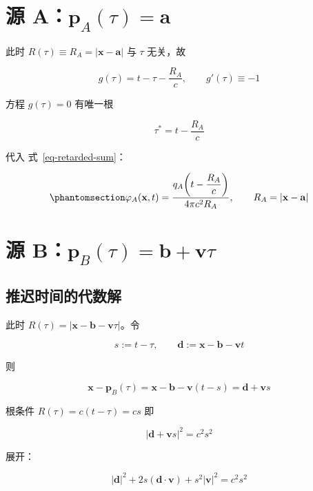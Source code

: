 \documentclass[
  chinese,
  a4paper,
  UTF8,
  12pt,
  oneside,
  openany]{ctexbook}
\theoremstyle{plain}
\theoremstyle{plain}
\theoremstyle{plain}
\theoremstyle{definition}
\theoremstyle{plain}
\theoremstyle{plain}
\theoremstyle{remark}
\begin{document}
\section{\texorpdfstring{源
A：\(\mathbf{p}_{A}(\tau)=\mathbf{a}\)}{源 A：\textbackslash mathbf\{p\}\_\{A\}(\textbackslash tau)=\textbackslash mathbf\{a\}}}\label{sec-tsf-source-a}

此时 \(R(\tau)\equiv R_{A}=|\mathbf{x}-\mathbf{a}|\) 与 \(\tau\)
无关，故

\[
g(\tau)=t-\tau-\frac{R_{A}}{c},\qquad g'(\tau)\equiv-1
\]

方程 \(g(\tau)=0\) 有唯一根

\[
\tau^{*}=t-\frac{R_{A}}{c}
\]

代入 式~\ref{eq-retarded-sum}：

\begin{equation}\protect\phantomsection\label{eq-field-A}{
\varphi_{A}(\mathbf{x},t)=\frac{q_{A}\!\left(t-\dfrac{R_{A}}{c}\right)}{4\pi c^{2}R_{A}},
\qquad R_{A}=|\mathbf{x}-\mathbf{a}|
}\end{equation}

\section{\texorpdfstring{源
B：\(\mathbf{p}_{B}(\tau)=\mathbf{b}+\mathbf{v}\tau\)}{源 B：\textbackslash mathbf\{p\}\_\{B\}(\textbackslash tau)=\textbackslash mathbf\{b\}+\textbackslash mathbf\{v\}\textbackslash tau}}\label{sec-tsf-source-b}

\subsection{推迟时间的代数解}\label{ux63a8ux8fdfux65f6ux95f4ux7684ux4ee3ux6570ux89e3}

此时 \(R(\tau)=|\mathbf{x}-\mathbf{b}-\mathbf{v}\tau|\)。令

\[
s:=t-\tau,\qquad \mathbf{d}:=\mathbf{x}-\mathbf{b}-\mathbf{v}t
\]

则

\[
\mathbf{x}-\mathbf{p}_{B}(\tau)=\mathbf{x}-\mathbf{b}-\mathbf{v}(t-s)=\mathbf{d}+\mathbf{v}s
\]

根条件 \(R(\tau)=c(t-\tau)=cs\) 即

\[
|\mathbf{d}+\mathbf{v}s|^{2}=c^{2}s^{2}
\]

展开：

\[
|\mathbf{d}|^{2}+2s(\mathbf{d}\cdot\mathbf{v})+s^{2}|\mathbf{v}|^{2}=c^{2}s^{2}
\]
\end{document}
